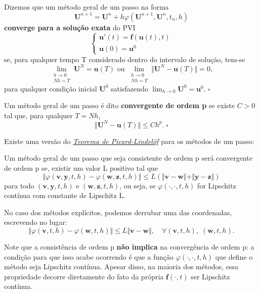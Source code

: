 \documentclass[../differential_methods.tex]{subfiles}
\begin{document}
\begin{def*}
	Dizemos que um método geral de um passo na forma
	\[
		\mathbf{U}^{n+1}=\mathbf{U}^{n}+h \varphi(\mathbf{U}^{n+1}, \mathbf{U}^{n}, t_{n}, h)
	\]
	\textbf{converge para a solução exata} do PVI
	\[
		\left\{\begin{array}{ll}
			\mathbf{u}'(t)=\mathbf{f}(\mathbf{u}(t), t) \\
			\mathbf{u}(0)=\mathbf{u}^{0}
		\end{array}\right.
	\]
	se, para qualquer tempo T considerado dentro do intervalo de solução, tem-se
	\[
		\lim_{\substack{h\to 0 \\ Nh = T}}\mathbf{U}^{N}=\mathbf{u}(T) \text{ ou }\lim_{\substack{h\to 0 \\ Nh = T}}\Vert \mathbf{U}^{N}-\mathbf{u}(T) \Vert=0,
	\]
	para qualquer condição inicial \(\mathbf{U}^{0}\) satisfazendo \(\displaystyle \lim_{h\to 0}\mathbf{U}^{0}=\mathbf{u}^{0}.\; \square\)
\end{def*}

\begin{def*}
	Um método geral de um passo é dito \textbf{convergente de ordem p} se existe \(C > 0\) tal que, para qualquer \(T= Nh\),
	\[
		\Vert \mathbf{U}^{N}-\mathbf{u}(T) \Vert \leq Ch^{p}. \; \square
	\]
\end{def*}

Existe uma versão do \hyperlink{picard_lindelof}{\textit{Teorema de Picard-Lindelöf}} para os métodos de um passo:
\begin{theorem*}
	Um método geral de um passo que seja consistente de ordem p será convergente de ordem p se, existir um valor L positivo tal que
	\[
		\Vert \varphi (\mathbf{v}, \mathbf{y}, t, h)-\varphi (\mathbf{w}, \mathbf{z}, t, h) \Vert\leq L(\Vert \mathbf{v}-\mathbf{w} \Vert + \Vert \mathbf{y}-\mathbf{z} \Vert)
	\]
	para todo \((\mathbf{v}, \mathbf{y}, t, h)\) e \((\mathbf{w}, \mathbf{z}, t, h)\), ou seja, se \(\varphi (\cdot , \cdot , t, h)\) for Lipschitz contínua com constante de Lipschitz L.
\end{theorem*}

No caso dos métodos explícitos, podemos derrubar uma das coordenadas, escrevendo no lugar:
\[
	\Vert \varphi (\mathbf{v}, t, h)-\varphi (\mathbf{w}, t, h) \Vert\leq L \Vert \mathbf{v}-\mathbf{w} \Vert, \quad \forall (\mathbf{v}, t, h),\; (\mathbf{w}, t, h).
\]

Note que a consistência de ordem p \textbf{não implica} na convergência de ordem p: a condição para que isso acabe ocorrendo é que a função \(\varphi (\cdot , \cdot , t, h)\) que define o método seja Lipschitz contínua.
Apesar disso, na maioria dos métodos, essa propriedade decorre diretamente do fato da própria \(\mathbf{f}(\cdot , t)\) ser Lipschitz contínua.
\end{document}
